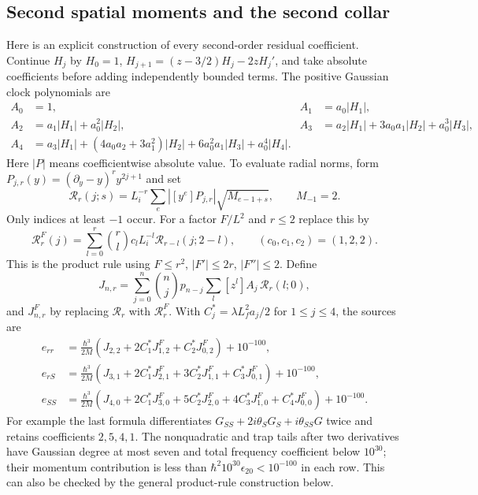 \documentclass[11pt]{article}
\theoremstyle{definition}\newtheorem{definition}[theorem]{Definition}
\theoremstyle{remark}\newtheorem{remark}[theorem]{Remark}
\begin{document}
\subsection{Second spatial moments and the second collar}\label{prep:hessian}
Here is an explicit construction of every second-order residual
coefficient. Continue $H_j$ by
$H_0=1$, $H_{j+1}=(z-3/2)H_j-2zH_j'$, and take absolute
coefficients before adding independently bounded terms. The positive
Gaussian clock polynomials are
\begin{align*}
 A_0&=1,& A_1&=a_0|H_1|,\\
 A_2&=a_1|H_1|+a_0^2|H_2|,&
 A_3&=a_2|H_1|+3a_0a_1|H_2|+a_0^3|H_3|,\\
 A_4&=a_3|H_1|+(4a_0a_2+3a_1^2)|H_2|
                       +6a_0^2a_1|H_3|+a_0^4|H_4|.
\end{align*}
Here $|P|$ means coefficientwise absolute value. To evaluate radial
norms, form
$P_{j,r}(y)=(\partial_y-y)^r y^{2j+1}$ and set
\[
 \mathcal R_r(j;s)=L_i^{-r}
       \sum_e |[y^e]P_{j,r}|\sqrt{M_{e-1+s}},\qquad M_{-1}=2.
\]
Only indices at least $-1$ occur. For a factor $F/L^2$ and $r\le2$
replace this by
\[
 \mathcal R_r^F(j)=\sum_{l=0}^r\binom rl c_lL_i^{-l}
                         \mathcal R_{r-l}(j;2-l),
 \qquad(c_0,c_1,c_2)=(1,2,2).
\]
This is the product rule using $F\le r^2$, $|F'|\le2r$,
$|F''|\le2$. Define
\[
 J_{n,r}=\sum_{j=0}^n\binom nj p_{n-j}
       \sum_l[z^l]A_j\,\mathcal R_r(l;0),
\]
and $J_{n,r}^F$ by replacing $\mathcal R_r$ with $\mathcal R_r^F$.
With $C_j^*=\lambda L_f^2a_j/2$ for $1\le j\le4$, the sources are
\begin{align*}
 e_{rr}&=\frac{\hbar^3}{2M}
       (J_{2,2}+2C_1^*J_{1,2}^F+C_2^*J_{0,2}^F)+10^{-100},\\
 e_{rS}&=\frac{\hbar^3}{2M}
       (J_{3,1}+2C_1^*J_{2,1}^F+3C_2^*J_{1,1}^F+C_3^*J_{0,1}^F)
       +10^{-100},\\
 e_{SS}&=\frac{\hbar^3}{2M}
       (J_{4,0}+2C_1^*J_{3,0}^F+5C_2^*J_{2,0}^F
                           +4C_3^*J_{1,0}^F+C_4^*J_{0,0}^F)+10^{-100}.
\end{align*}
For example the last formula differentiates
$G_{SS}+2i\theta_SG_S+i\theta_{SS}G$ twice and retains coefficients
$2,5,4,1$. The nonquadratic and trap tails after two derivatives have
Gaussian degree at most seven and total frequency coefficient below
$10^{30}$; their momentum contribution is less than
$\hbar^2 10^{30}\epsilon_{20}<10^{-100}$ in each row. This can also be
checked by the general product-rule construction below.
\end{document}
